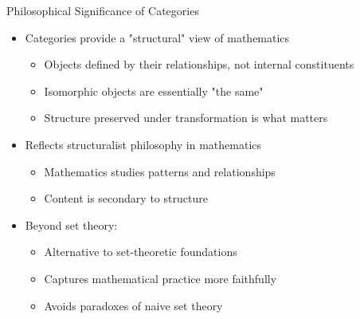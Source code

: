 \documentclass{beamer}
\begin{document}
\begin{frame}{Philosophical Significance of Categories}
    \begin{itemize}
        \item Categories provide a "structural" view of mathematics
            \begin{itemize}
                \item Objects defined by their relationships, not internal constituents
                \item Isomorphic objects are essentially "the same"
                \item Structure preserved under transformation is what matters
            \end{itemize}
        \item Reflects structuralist philosophy in mathematics
            \begin{itemize}
                \item Mathematics studies patterns and relationships
                \item Content is secondary to structure
            \end{itemize}
        \item Beyond set theory:
            \begin{itemize}
                \item Alternative to set-theoretic foundations
                \item Captures mathematical practice more faithfully
                \item Avoids paradoxes of naive set theory
            \end{itemize}
    \end{itemize}
\end{frame}
\end{document}
